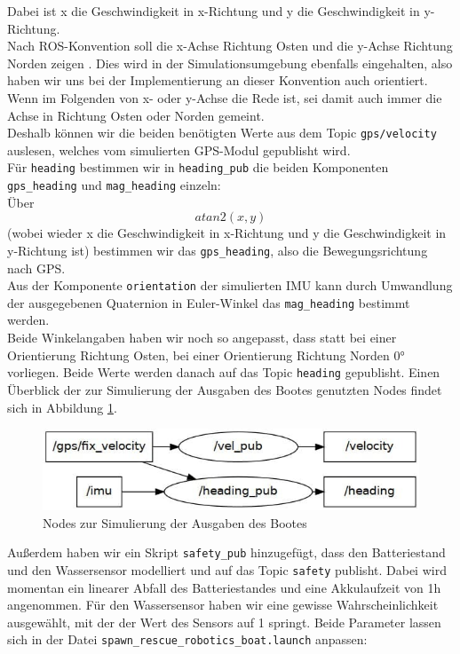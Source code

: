 \documentclass[11pt]{article}
\begin{document}
Dabei ist x die Geschwindigkeit in x-Richtung und y die Geschwindigkeit in y-Richtung.\\
Nach ROS-Konvention soll die x-Achse Richtung Osten und die y-Achse Richtung Norden zeigen \cite{REP105}. Dies wird in der Simulationsumgebung ebenfalls eingehalten, also haben wir uns bei der Implementierung an dieser Konvention auch orientiert. Wenn im Folgenden von x- oder y-Achse die Rede ist, sei damit auch immer die Achse in Richtung Osten oder Norden gemeint.\\
Deshalb können wir die beiden benötigten Werte aus dem Topic \texttt{gps/velocity} auslesen, welches vom simulierten GPS-Modul gepublisht wird.\\
Für \texttt{heading} bestimmen wir in \texttt{heading\_pub} die beiden Komponenten \texttt{gps\_heading} und \texttt{mag\_heading} einzeln:\\
Über 
\begin{equation}
	atan2(x,y) 	
\end{equation}
(wobei wieder x die Geschwindigkeit in x-Richtung und y die Geschwindigkeit in y-Richtung ist) bestimmen wir das \texttt{gps\_heading}, also die Bewegungsrichtung nach GPS. \\
Aus der Komponente \texttt{orientation} der simulierten IMU kann durch Umwandlung der ausgegebenen Quaternion in Euler-Winkel das \texttt{mag\_heading} bestimmt werden.\\
Beide Winkelangaben haben wir noch so angepasst, dass statt bei einer Orientierung Richtung Osten, bei einer Orientierung Richtung Norden 0° vorliegen. Beide Werte werden danach auf das Topic \texttt{heading} gepublisht. Einen Überblick der zur Simulierung der Ausgaben des Bootes genutzten Nodes findet sich in Abbildung \ref{output-sim-nodes}.\\

\begin{figure}[h]
	\centering
	\includegraphics[width=0.7\linewidth]{simulation-nodes}
	\caption{Nodes zur Simulierung der Ausgaben des Bootes}
	\label{output-sim-nodes}
\end{figure}
Außerdem haben wir ein Skript \texttt{safety\_pub} hinzugefügt, dass den Batteriestand und den Wassersensor modelliert und auf das Topic \texttt{safety} publisht. Dabei wird momentan ein linearer Abfall des Batteriestandes und eine Akkulaufzeit von 1h angenommen. Für den Wassersensor haben wir eine gewisse Wahrscheinlichkeit ausgewählt, mit der der Wert des Sensors auf 1 springt. Beide Parameter lassen sich in der Datei \texttt{spawn\_rescue\_robotics\_boat.launch} anpassen:
\end{document}

